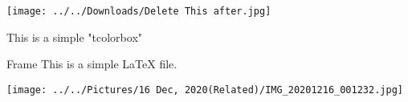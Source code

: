 \documentclass[11 pt]{report}
\begin{document}
\texttt{[image: ../../Downloads/Delete This after.jpg]} 

\begin{tcolorbox}
 This is a simple "tcolorbox"
\end{tcolorbox}

\begin{frame}{Frame}
 This is a simple \LaTeX{} file.
\end{frame}

\pagebreak

\texttt{[image: ../../Pictures/16 Dec, 2020(Related)/IMG\_20201216\_001232.jpg]}
\end{document}
